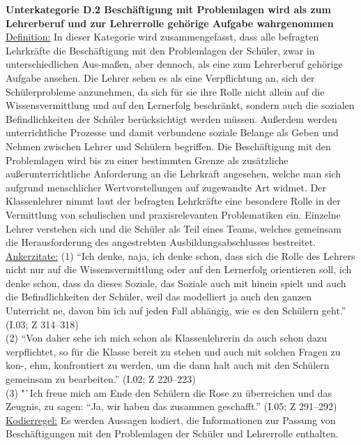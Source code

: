 \noindent
\textbf{Unterkategorie D.2 Beschäftigung mit Problemlagen wird als zum Lehrerberuf und zur Lehrerrolle gehörige Aufgabe wahrgenommen}\\
\underline{Definition:} In dieser Kategorie wird zusammengefasst, dass alle befragten Lehrkräfte die Beschäftigung mit den Problemlagen der Schüler, zwar in unterschiedlichen Aus-maßen, aber dennoch, als eine zum Lehrerberuf gehörige Aufgabe ansehen. Die Lehrer sehen es als eine Verpflichtung an, sich der Schülerprobleme anzunehmen, da sich für sie ihre Rolle nicht allein auf die Wissensvermittlung und auf den Lernerfolg beschränkt, sondern auch die sozialen Befindlichkeiten der Schüler berücksichtigt werden müssen. Außerdem werden unterrichtliche Prozesse und damit verbundene soziale Belange als Geben und Nehmen zwischen Lehrer und Schülern begriffen. Die Beschäftigung mit den Problemlagen wird bis zu einer bestimmten Grenze als zusätzliche außerunterrichtliche Anforderung an die Lehrkraft angesehen, welche man sich aufgrund menschlicher Wertvorstellungen auf zugewandte Art widmet. Der Klassenlehrer nimmt laut der befragten Lehrkräfte eine besondere Rolle in der Vermittlung von schulischen und praxisrelevanten Problematiken ein. Einzelne Lehrer verstehen sich und die Schüler als Teil eines Teams, welches gemeinsam die Herausforderung des angestrebten Ausbildungsabschlusses bestreitet.\\
\underline{Ankerzitate:} (1) "`Ich denke, naja, ich denke schon, dass sich die Rolle des Lehrers nicht nur auf die Wissensvermittlung oder auf den Lernerfolg orientieren soll, ich denke schon, dass da dieses Soziale, das Soziale auch mit hinein spielt und auch die Befindlichkeiten der Schüler, weil das modelliert ja auch den ganzen Unterricht ne, davon bin ich auf jeden Fall abhängig, wie es den Schülern geht."' (I.03; Z 314--318)\\ (2) "`Von daher sehe ich mich schon als Klassenlehrerin da auch schon dazu verpflichtet, so für die Klasse bereit zu stehen und auch mit solchen Fragen zu kon-, ehm, konfrontiert zu werden, um die dann halt auch mit den Schülern gemeinsam zu bearbeiten."' (I.02; Z 220--223)\\ (3) "`Ich freue mich am Ende den Schülern die Rose zu überreichen und das Zeugnis, zu sagen: "`Ja, wir haben das zusammen geschafft."' (I.05; Z 291--292)\\
\underline{Kodierregel:} Es werden Aussagen kodiert, die Informationen zur Passung von Beschäftigungen mit den Problemlagen der Schüler und Lehrerrolle enthalten.\\

